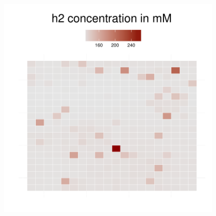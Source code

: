 \begin{figure}[h!]
{\begin{minipage}[t]{0.3\textwidth}
  \end{minipage}
  \begin{minipage}[t]{0.3\textwidth}
    \includegraphics[width=\textwidth]{../results/beijerinckii_20x20_seed943_h265.pdf}
  \end{minipage}
  }
\end{figure}
